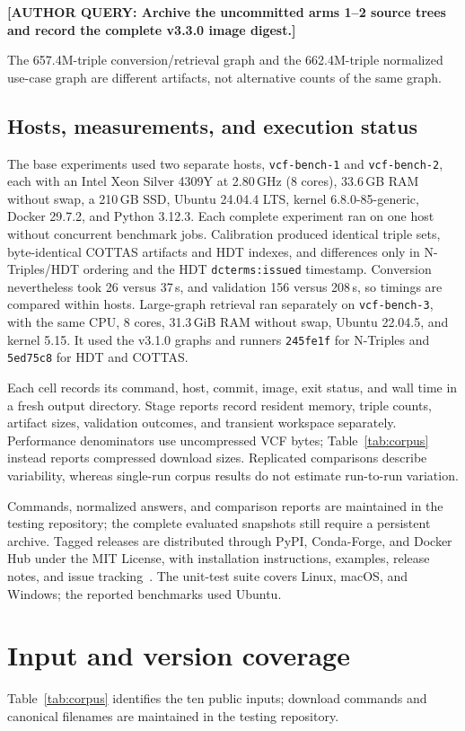 \documentclass[11pt]{article}
\newcommand{\authorquery}[1]{\par\smallskip\noindent\begin{minipage}{\linewidth}\color{queryorange}\textbf{[AUTHOR QUERY: #1]}\end{minipage}\par\smallskip}
\begin{document}
\authorquery{Archive the uncommitted arms 1--2 source trees and record the complete v3.3.0 image digest.}
The 657.4M-triple conversion/retrieval graph and the 662.4M-triple normalized use-case graph are different artifacts, not alternative counts of the same graph.

\subsection{Hosts, measurements, and execution status}\label{subsec:repro-hosts}
The base experiments used two separate hosts, \texttt{vcf-bench-1} and \texttt{vcf-bench-2}, each with an Intel Xeon Silver 4309Y at 2.80\,GHz (8 cores), 33.6\,GB RAM without swap, a 210\,GB SSD, Ubuntu 24.04.4 LTS, kernel 6.8.0-85-generic, Docker 29.7.2, and Python 3.12.3.
Each complete experiment ran on one host without concurrent benchmark jobs.
Calibration produced identical triple sets, byte-identical COTTAS artifacts and HDT indexes, and differences only in N-Triples/HDT ordering and the HDT \texttt{dcterms:issued} timestamp.
Conversion nevertheless took 26 versus 37\,s, and validation 156 versus 208\,s, so timings are compared within hosts.
Large-graph retrieval ran separately on \texttt{vcf-bench-3}, with the same CPU, 8 cores, 31.3\,GiB RAM without swap, Ubuntu 22.04.5, and kernel 5.15.
It used the v3.1.0 graphs and runners \texttt{245fe1f} for N-Triples and \texttt{5ed75c8} for HDT and COTTAS.

Each cell records its command, host, commit, image, exit status, and wall time in a fresh output directory.
Stage reports record resident memory, triple counts, artifact sizes, validation outcomes, and transient workspace separately.
Performance denominators use uncompressed VCF bytes; Table~\ref{tab:corpus} instead reports compressed download sizes.
Replicated comparisons describe variability, whereas single-run corpus results do not estimate run-to-run variation.

Commands, normalized answers, and comparison reports are maintained in the testing repository; the complete evaluated snapshots still require a persistent archive.
Tagged releases are distributed through PyPI, Conda-Forge, and Docker Hub under the MIT License, with installation instructions, examples, release notes, and issue tracking~\cite{jimenez_2017_f1000}.
The unit-test suite covers Linux, macOS, and Windows; the reported benchmarks used Ubuntu.

\section{Input and version coverage}\label{sec:inputs}
Table~\ref{tab:corpus} identifies the ten public inputs; download commands and canonical filenames are maintained in the testing repository.
\end{document}
